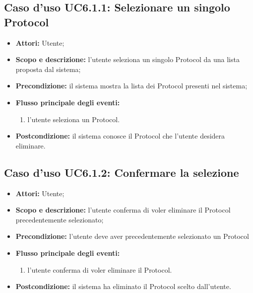 \subsection{Caso d'uso UC6.1.1: Selezionare un singolo Protocol}
\begin{itemize}
\item \textbf{Attori:} Utente;
\item \textbf{Scopo e descrizione:} l'utente seleziona un singolo Protocol\glossario{} da una lista proposta dal sistema;
\item \textbf{Precondizione:} il sistema mostra la lista dei Protocol\glossario{} presenti nel sistema;
\item \textbf{Flusso principale degli eventi:}
\begin{enumerate}
\item l'utente seleziona un Protocol\glossario{}.
\end{enumerate}
\item \textbf{Postcondizione: } il sistema conosce il Protocol\glossario{} che l'utente desidera eliminare.
\end{itemize}

\subsection{Caso d'uso UC6.1.2: Confermare la selezione}
\begin{itemize}
\item \textbf{Attori:} Utente;
\item \textbf{Scopo e descrizione:} l'utente conferma di voler eliminare il Protocol\glossario{} precedentemente selezionato;
\item \textbf{Precondizione:} l'utente deve aver precedentemente selezionato un Protocol
\item \textbf{Flusso principale degli eventi:}
\begin{enumerate}
\item l'utente conferma di voler eliminare il Protocol\glossario{}.
\end{enumerate}
\item \textbf{Postcondizione:} il sistema ha eliminato il Protocol\glossario{} scelto dall'utente.
\end{itemize}

